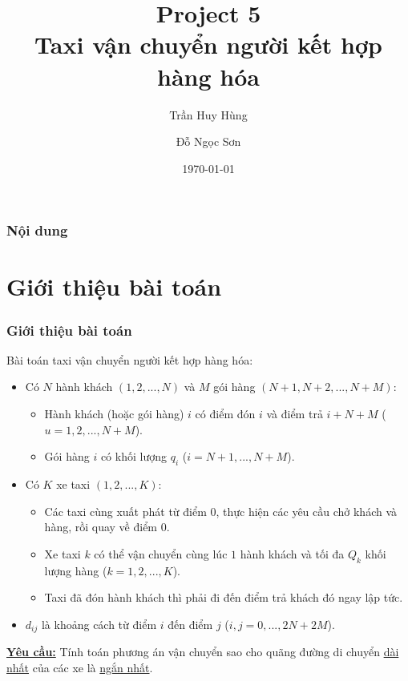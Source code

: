 \documentclass{beamer}
\title[Project 5]{Project 5 \\
	Taxi vận chuyển người kết hợp hàng hóa} %
\author{Trần Huy Hùng\and Đỗ Ngọc Sơn} %
\institute[HUST] %
{
	Đại học Bách Khoa Hà Nội \\ %
	\medskip
}
\date{\today} %
\begin{document}
	
	\maketitle
	
	\begin{frame}
		\frametitle{Nội dung} %
		\tableofcontents[hidesubsections]
	\end{frame}
	
	
	\section{Giới thiệu bài toán} %
	
	
	\begin{frame}
		\frametitle{Giới thiệu bài toán}
		Bài toán taxi vận chuyển người kết hợp hàng hóa:
		\begin{itemize}
			\item {
				Có $N$ hành khách $(1,2,...,N)$ và $M$ gói hàng $(N+1,N+2,...,N+M)$:
				\begin{itemize}
					\item Hành khách (hoặc gói hàng) $i$ có điểm đón $i$ và điểm trả $i+N+M$ ($u=1,2,...,N+M$).
					\item Gói hàng $i$ có khối lượng $q_i$ ($i=N+1,...,N+M$).
				\end{itemize}
			}
			\item {
				Có $K$ xe taxi $(1,2,...,K)$:
				\begin{itemize}
					\item Các taxi cùng xuất phát từ điểm $0$, thực hiện các yêu cầu chở khách và hàng, rồi quay về điểm $0$.
					\item Xe taxi $k$ có thể vận chuyển cùng lúc $1$ hành khách và tối đa $Q_k$ khối lượng hàng ($k=1,2,...,K$).
					\item Taxi đã đón hành khách thì phải đi đến điểm trả khách đó ngay lập tức.
				\end{itemize}
			}
			\item $d_{ij}$ là khoảng cách từ điểm $i$ đến điểm $j$ ($i,j=0,...,2N+2M$).
		\end{itemize}
		\textbf{\underline{Yêu cầu:}} Tính toán phương án vận chuyển sao cho quãng đường di chuyển \underline{dài nhất} của các xe là \underline{ngắn nhất}.
	\end{frame}
\end{document}
